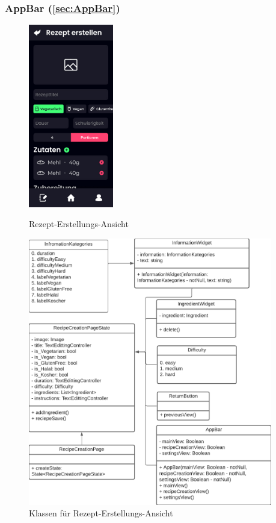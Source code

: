 \documentclass[parskip=full]{scrartcl}
\begin{document}
        \subsubsection*{AppBar (\ref{sec:AppBar})}
            \begin{figure}[htp]
                \begin{minipage}
                    [t]{0.49\textwidth}
                    \centering
                    \includegraphics[height=80mm]{images/Presentation-layer/RecipeCreationView.jpg}
                    \caption{Rezept-Erstellungs-Ansicht}
                \end{minipage}
                \begin{minipage}
                    [t]{0.49\textwidth}
                    \centering
                    \includegraphics[width=0.95\textwidth]{images/Presentation-layer/RecipeCreationViewClass.pdf}
                    \caption{Klassen für Rezept-Erstellungs-Ansicht}
                \end{minipage}
            \end{figure}
\end{document}
